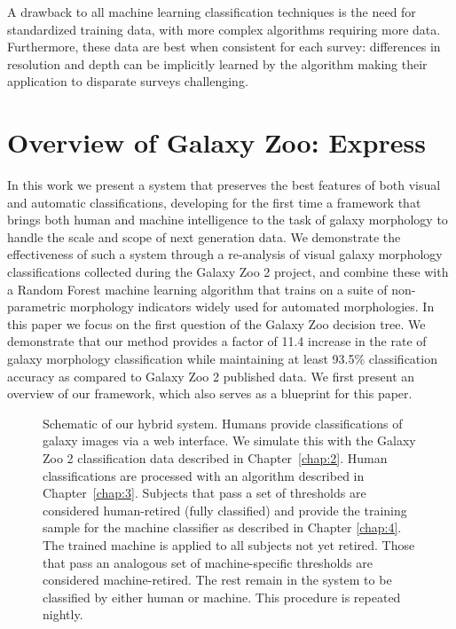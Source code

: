 A drawback to all machine learning classification techniques is the need for standardized training data, with more complex algorithms requiring more data. Furthermore, these data are best when consistent for each survey: differences in resolution and depth can be implicitly learned by the algorithm making their application to disparate surveys challenging. 


\section{Overview of Galaxy Zoo: Express}

 In this work we present a system that preserves the best features of both visual and automatic classifications, developing for the first time a framework that brings both human and machine intelligence to the task of galaxy morphology to handle the scale and scope of next generation data. We demonstrate the effectiveness of such a system through a re-analysis of visual galaxy morphology classifications collected during the Galaxy Zoo 2 project, and combine these with a Random Forest machine learning algorithm that trains on a suite of non-parametric morphology indicators widely used for automated morphologies. In this paper we focus on the first question of the Galaxy Zoo decision tree. We demonstrate that our method provides a factor of 11.4 increase in the rate of galaxy morphology classification  while maintaining at least 93.5\% classification accuracy as compared to Galaxy Zoo 2 published data. We first present an overview of our framework, which also serves as a blueprint for this paper. 


\begin{figure}[ht!]
\caption[Schematic of the Galaxy Zoo: Express human+machine hybrid system.]{Schematic of our hybrid system. Humans provide classifications of galaxy images via a web interface. We simulate this with the Galaxy Zoo 2 classification data described in Chapter~\ref{chap:2}. Human classifications are processed with an algorithm described in Chapter~\ref{chap:3}. Subjects that pass a set of thresholds are considered human-retired (fully classified) and provide the training sample for the machine classifier as described in Chapter \ref{chap:4}. The trained machine is applied to all subjects not yet retired. Those that pass an analogous set of machine-specific thresholds are considered machine-retired. The rest remain in the system to be classified by either human or machine. This procedure is repeated  nightly. \label{fig: schematic}}
\end{figure}


